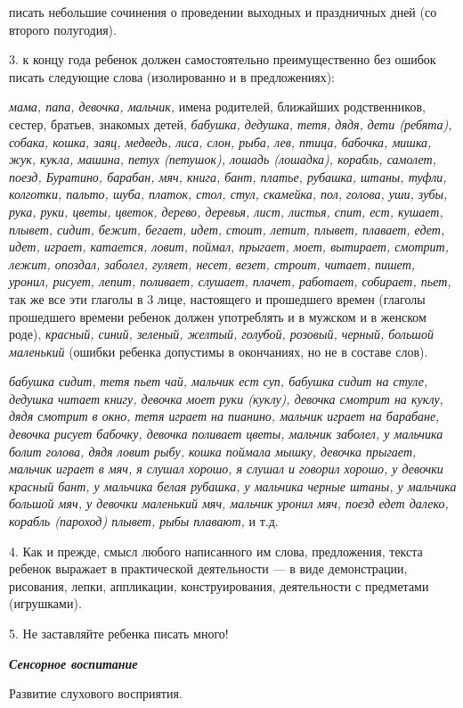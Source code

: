 \documentclass{book}
\renewcommand{\emph}[1]{\textit{#1}}
\begin{document}
писать небольшие сочинения о проведении выходных и праздничных дней (со
второго полугодия).

3. к концу года ребенок должен самостоятельно преимущественно без ошибок
писать следующие слова (изолированно и в предложениях):

\emph{мама, папа, девочка, мальчик,} имена родителей, ближайших
родственников, сестер, братьев, знакомых детей, \emph{бабушка, дедушка,
тетя, дядя, дети (ребята), собака, кошка, заяц, медведь, лиса, слон,
рыба, лев, птица, бабочка, мишка, жук, кукла, машина, петух (петушок),
лошадь (лошадка), корабль, самолет, поезд, Буратино, барабан, мяч,
книга, бант, платье, рубашка, штаны, туфли, колготки, пальто, шуба,
платок, стол, стул, скамейка, пол, голова, уши, зубы, рука, руки, цветы,
цветок, дерево, деревья, лист, листья, спит, ест, кушает, плывет, сидит,
бежит, бегает, идет, стоит, летит, плывет, плавает, едет, идет, играет,
катается, ловит, поймал, прыгает, моет, вытирает, смотрит, лежит,
опоздал, заболел, гуляет, несет, везет, строит, читает, пишет, уронил,
рисует, лепит, поливает, слушает, плачет, работает, собирает, пьет,} так
же все эти глаголы в 3 лице, настоящего и прошедшего времен (глаголы
прошедшего времени ребенок должен употреблять и в мужском и в женском
роде), \emph{красный, синий, зеленый, желтый, голубой, розовый, черный,
большой маленький} (ошибки ребенка допустимы в окончаниях, но не в
составе слов).

\emph{бабушка сидит, тетя пьет чай, мальчик ест суп, бабушка сидит на
стуле, дедушка читает книгу, девочка моет руки (куклу), девочка смотрит
на куклу, дядя смотрит в окно, тетя играет на пианино, мальчик играет на
барабане, девочка рисует бабочку, девочка поливает цветы, мальчик
заболел, у мальчика болит голова, дядя ловит рыбу, кошка поймала мышку,
девочка прыгает, мальчик играет в мяч, я слушал хорошо, я слушал и
говорил хорошо, у девочки красный бант, у мальчика белая рубашка, у
мальчика черные штаны, у мальчика большой мяч, у девочки маленький мяч,
мальчик уронил мяч, поезд едет далеко, корабль (пароход) плывет, рыбы
плавают,} и т.д.

4. Как и прежде, смысл любого написанного им слова, предложения, текста
ребенок выражает в практической деятельности --- в виде демонстрации,
рисования, лепки, аппликации, конструирования, деятельности с предметами
(игрушками).

5. Не заставляйте ребенка писать много!

\emph{\textbf{Сенсорное воспитание}}

Развитие слухового восприятия.
\end{document}
